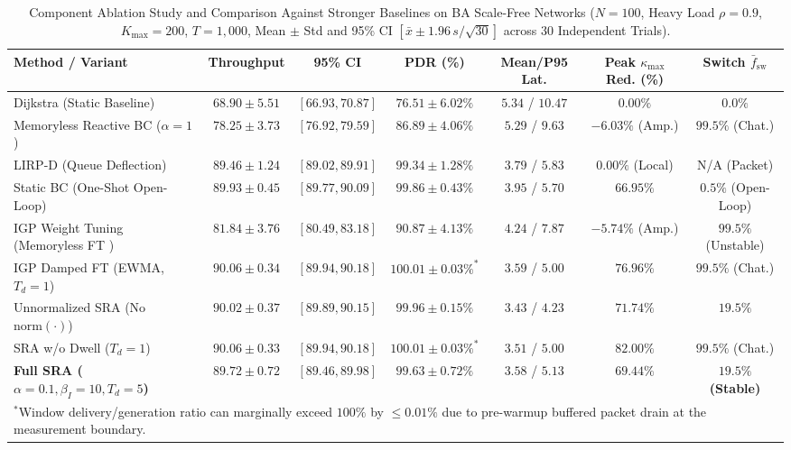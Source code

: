 \documentclass[journal]{IEEEtran}
\theoremstyle{plain}
\theoremstyle{definition}
\newcommand{\rev}[1]{{\color{blue}#1}}
\begin{document}
\begin{table}[t!]
\centering
\caption{\rev{Component Ablation Study and Comparison Against Stronger Baselines on BA Scale-Free Networks ($N=100$, Heavy Load $\rho=0.9$, $K_{\max}=200$, $T=1{,}000$, Mean $\pm$ Std and 95\% CI $[\bar{x} \pm 1.96\,s/\sqrt{30}]$ across 30 Independent Trials).}}
\label{tab:ablation_results}
\renewcommand{\arraystretch}{1.05}
\scriptsize\setlength{\tabcolsep}{3.5pt}
\begin{tabular}{|l|c|c|c|c|c|c|}
\hline
\textbf{Method / Variant} & \textbf{Throughput} & \textbf{95\% CI} & \textbf{PDR (\%)} & \textbf{Mean/P95 Lat.} & \textbf{Peak $\kappa_{\max}$ Red. (\%)} & \textbf{Switch $\bar{f}_{\text{sw}}$} \\
\hline\hline
Dijkstra (Static Baseline) & $68.90 \pm 5.51$ & $[66.93, 70.87]$ & $76.51 \pm 6.02\%$ & $5.34$ / $10.47$ & $0.00\%$ & $0.0\%$ \\
\hline
Memoryless Reactive BC ($\alpha=1$) & $78.25 \pm 3.73$ & $[76.92, 79.59]$ & $86.89 \pm 4.06\%$ & $5.29$ / $9.63$ & $-6.03\%$ (Amp.) & $99.5\%$ (Chat.) \\
\hline
LIRP-D (Queue Deflection) & $89.46 \pm 1.24$ & $[89.02, 89.91]$ & $99.34 \pm 1.28\%$ & $3.79$ / $5.83$ & $0.00\%$ (Local) & N/A (Packet) \\
\hline
Static BC (One-Shot Open-Loop) & $89.93 \pm 0.45$ & $[89.77, 90.09]$ & $99.86 \pm 0.43\%$ & $3.95$ / $5.70$ & $66.95\%$ & $0.5\%$ (Open-Loop) \\
\hline
IGP Weight Tuning (Memoryless FT \cite{Fortz2000OSPF}) & $81.84 \pm 3.76$ & $[80.49, 83.18]$ & $90.87 \pm 4.13\%$ & $4.24$ / $7.87$ & $-5.74\%$ (Amp.) & $99.5\%$ (Unstable) \\
\hline
IGP Damped FT (EWMA, $T_d=1$) & $90.06 \pm 0.34$ & $[89.94, 90.18]$ & $100.01 \pm 0.03\%^*$ & $3.59$ / $5.00$ & $76.96\%$ & $99.5\%$ (Chat.) \\
\hline
Unnormalized SRA (No $\mathrm{norm}(\cdot)$) & $90.02 \pm 0.37$ & $[89.89, 90.15]$ & $99.96 \pm 0.15\%$ & $3.43$ / $4.23$ & $71.74\%$ & $19.5\%$ \\
\hline
SRA w/o Dwell ($T_d=1$) & $90.06 \pm 0.33$ & $[89.94, 90.18]$ & $100.01 \pm 0.03\%^*$ & $3.51$ / $5.00$ & $82.00\%$ & $99.5\%$ (Chat.) \\
\hline
\textbf{Full SRA ($\alpha=0.1, \beta_I=10, T_d=5$)} & $\mathbf{89.72 \pm 0.72}$ & $\mathbf{[89.46, 89.98]}$ & $\mathbf{99.63 \pm 0.72\%}$ & $\mathbf{3.58}$ / $\mathbf{5.13}$ & $\mathbf{69.44\%}$ & $\mathbf{19.5\%}$ \textbf{(Stable)} \\
\hline
\multicolumn{7}{l}{\scriptsize\rev{$^*$Window delivery/generation ratio can marginally exceed $100\%$ by $\le 0.01\%$ due to pre-warmup buffered packet drain at the measurement boundary.}}
\end{tabular}
\end{table}
\end{document}
